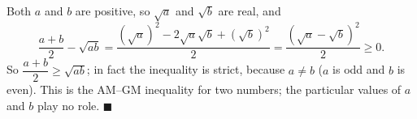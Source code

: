 Both $a$ and $b$ are positive, so $\sqrt a$ and $\sqrt b$ are real, and
\[\dfrac{a+b}{2}-\sqrt{ab}=\dfrac{\left(\sqrt a\right)^2-2\sqrt a\sqrt b+\left(\sqrt b\right)^2}{2}=\dfrac{\left(\sqrt a-\sqrt b\right)^2}{2}\ge0 .\]
So $\dfrac{a+b}{2}\ge\sqrt{ab}$; in fact the inequality is strict, because $a\ne b$ ($a$ is odd and $b$ is even). This is the AM--GM inequality for two numbers; the particular values of $a$ and $b$ play no role. $\blacksquare$
